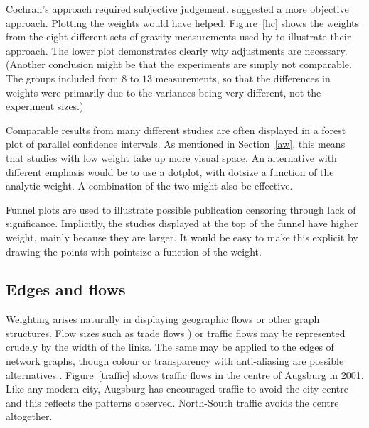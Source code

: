 \documentclass{svmult}
\begin{document}
Cochran's approach required subjective judgement.  \cite{mosteller:1982} suggested a more objective approach.  Plotting the weights would have helped.  Figure~\ref{hc} shows the weights from the eight different sets of gravity measurements used by \cite{mosteller:1982} to illustrate their approach.  The lower plot demonstrates clearly why adjustments are necessary.  (Another conclusion might be that the experiments are simply not comparable.  The groups included from $8$ to $13$ measurements, so that the differences in weights were primarily due to the variances being very different, not the experiment sizes.)

Comparable results from many different studies are often displayed in a forest plot of parallel confidence intervals.  As mentioned in Section~\ref{aw}, this means that studies with low weight take up more visual space.  An alternative with different emphasis would be to use a dotplot, with dotsize a function of the analytic weight.  A combination of the two might also be effective.

Funnel plots are used to illustrate possible publication censoring through lack of significance.  Implicitly, the studies displayed at the top of the funnel have higher weight, mainly because they are larger.  It would be easy to make this explicit by drawing the points with pointsize a function of the weight.

\subsection{Edges and flows}
\label{edge}
Weighting arises naturally in displaying geographic flows or other graph structures.  Flow sizes such as trade flows \citep{unwin:1992}) or traffic flows may be represented crudely by the width of the links.  The same may be applied to the edges of network graphs, though colour or transparency with anti-aliasing are possible alternatives \citep{wills:2006}.  Figure~\ref{traffic} shows traffic flows in the centre of Augsburg in 2001.   Like any modern city, Augsburg has encouraged traffic to avoid the city centre and this reflects the patterns observed.  North-South traffic avoids the centre altogether.
\end{document}

